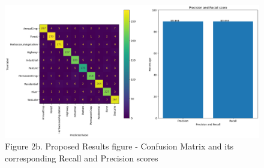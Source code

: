 \documentclass[acmtog]{acmart}
\begin{document}
	
	\begin{figure}[h]
		\centering
		\includegraphics[scale=0.5]{src/images/Fig3b.png}\\
		Figure 2b. Proposed Results figure - Confusion Matrix and its corresponding Recall and Precision scores
	\end{figure}
\end{document}
